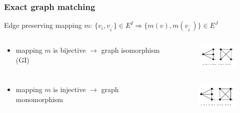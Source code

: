 \documentclass[hyperref={pdfpagelabels=false}]{beamer}
\begin{document}
\begin{frame}[allowframebreaks]
\frametitle{Exact graph matching}
Edge preserving mapping $m$:
$\{v_i,v_{i^\prime}\}\in E^I\Rightarrow\{m(v),m(v_{i^\prime})\}\in E^J$ %

\begin{minipage}[0.2\textheight]{\textwidth}
	\begin{columns}[T]
		\begin{column}{0.6\textwidth}
			\begin{itemize}
			\item mapping $m$ is bijective $\rightarrow$ graph isomorphism (GI)
			\end{itemize}
		\end{column}
		\begin{column}{0.3\textwidth}
			\begin{figure}[h!]
			    \centering
			    \includegraphics[width=2cm]{fig/GI}
			\end{figure}
		\end{column}
	\end{columns}
\end{minipage}

\begin{minipage}[0.2\textheight]{\textwidth}
	\begin{columns}[T]
		\begin{column}{0.6\textwidth}
			\begin{itemize}
			\item mapping $m$ is injective $\rightarrow$ graph monomorphism
			\end{itemize}
		\end{column}
		\begin{column}{0.3\textwidth}
			\begin{figure}[h!]
			    \centering
			    \includegraphics[width=2cm]{fig/monomorphism}
			\end{figure}
		\end{column}
	\end{columns}
\end{minipage}


\end{frame}
\end{document}
